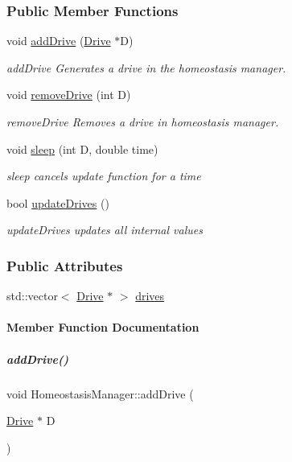 \subsubsection*{Public Member Functions}
\begin{DoxyCompactItemize}
\item 
void \hyperlink{group__homeostasis_a3c699fb7bba30e09adc0f9650f8aa481}{add\+Drive} (\hyperlink{group__homeostasis_classDrive}{Drive} $\ast$D)
\begin{DoxyCompactList}\small\item\em add\+Drive Generates a drive in the homeostasis manager. \end{DoxyCompactList}\item 
void \hyperlink{group__homeostasis_a47f7063f612ac4a4a1cbf96bf289fa56}{remove\+Drive} (int D)
\begin{DoxyCompactList}\small\item\em remove\+Drive Removes a drive in homeostasis manager. \end{DoxyCompactList}\item 
void \hyperlink{group__homeostasis_a334738e699f022c7d364a01fa8b77231}{sleep} (int D, double time)
\begin{DoxyCompactList}\small\item\em sleep cancels update function for a time \end{DoxyCompactList}\item 
bool \hyperlink{group__homeostasis_ae904ca4369d3816c2cbccb7a36b4b54f}{update\+Drives} ()
\begin{DoxyCompactList}\small\item\em update\+Drives updates all internal values \end{DoxyCompactList}\end{DoxyCompactItemize}
\subsubsection*{Public Attributes}
\begin{DoxyCompactItemize}
\item 
std\+::vector$<$ \hyperlink{group__homeostasis_classDrive}{Drive} $\ast$ $>$ \hyperlink{group__homeostasis_ab1634f96f9e9104efcbe470c75a7f2f0}{drives}
\end{DoxyCompactItemize}


\paragraph{Member Function Documentation}
\mbox{\label{group__homeostasis_a3c699fb7bba30e09adc0f9650f8aa481}} 
\subparagraph{\texorpdfstring{add\+Drive()}{addDrive()}}
{\footnotesize\ttfamily void Homeostasis\+Manager\+::add\+Drive (\begin{DoxyParamCaption}\item[{\hyperlink{group__homeostasis_classDrive}{Drive} $\ast$}]{D }\end{DoxyParamCaption})}



